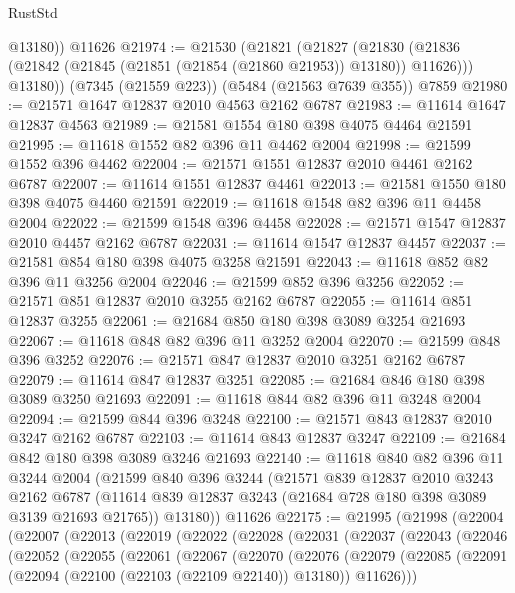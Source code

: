 \begin{lexlean}{RustStd}
\begin{coremodule}
        @13180))
    @11626
@21974 := @21530
    (@21821
      (@21827
        (@21830 (@21836 (@21842 (@21845 (@21851 (@21854 (@21860 @21953)) @13180)) @11626)))
        @13180))
    (@7345 (@21559 @223))
    (@5484 (@21563 @7639 @355))
    @7859
@21980 := @21571 @1647 @12837 @2010 @4563 @2162 @6787
@21983 := @11614 @1647 @12837 @4563
@21989 := @21581 @1554 @180 @398 @4075 @4464 @21591
@21995 := @11618 @1552 @82 @396 @11 @4462 @2004
@21998 := @21599 @1552 @396 @4462
@22004 := @21571 @1551 @12837 @2010 @4461 @2162 @6787
@22007 := @11614 @1551 @12837 @4461
@22013 := @21581 @1550 @180 @398 @4075 @4460 @21591
@22019 := @11618 @1548 @82 @396 @11 @4458 @2004
@22022 := @21599 @1548 @396 @4458
@22028 := @21571 @1547 @12837 @2010 @4457 @2162 @6787
@22031 := @11614 @1547 @12837 @4457
@22037 := @21581 @854 @180 @398 @4075 @3258 @21591
@22043 := @11618 @852 @82 @396 @11 @3256 @2004
@22046 := @21599 @852 @396 @3256
@22052 := @21571 @851 @12837 @2010 @3255 @2162 @6787
@22055 := @11614 @851 @12837 @3255
@22061 := @21684 @850 @180 @398 @3089 @3254 @21693
@22067 := @11618 @848 @82 @396 @11 @3252 @2004
@22070 := @21599 @848 @396 @3252
@22076 := @21571 @847 @12837 @2010 @3251 @2162 @6787
@22079 := @11614 @847 @12837 @3251
@22085 := @21684 @846 @180 @398 @3089 @3250 @21693
@22091 := @11618 @844 @82 @396 @11 @3248 @2004
@22094 := @21599 @844 @396 @3248
@22100 := @21571 @843 @12837 @2010 @3247 @2162 @6787
@22103 := @11614 @843 @12837 @3247
@22109 := @21684 @842 @180 @398 @3089 @3246 @21693
@22140 := @11618
    @840
    @82
    @396
    @11
    @3244
    @2004
    (@21599
      @840
      @396
      @3244
      (@21571
        @839
        @12837
        @2010
        @3243
        @2162
        @6787
        (@11614 @839 @12837 @3243 (@21684 @728 @180 @398 @3089 @3139 @21693 @21765))
        @13180))
    @11626
@22175 := @21995
    (@21998
      (@22004
        (@22007
          (@22013
            (@22019
              (@22022
                (@22028
                  (@22031
                    (@22037
                      (@22043
                        (@22046
                          (@22052
                            (@22055
                              (@22061
                                (@22067
                                  (@22070
                                    (@22076
                                      (@22079
                                        (@22085
                                          (@22091
                                            (@22094 (@22100 (@22103 (@22109 @22140)) @13180))
                                            @11626)))

\end{coremodule}
\end{lexlean}
